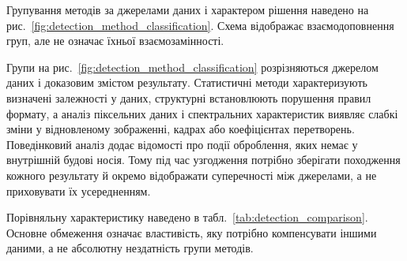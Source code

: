 Групування методів за джерелами даних і характером рішення наведено на рис.~\ref{fig:detection_method_classification}. Схема відображає взаємодоповнення груп, але не означає їхньої взаємозамінності.



Групи на рис.~\ref{fig:detection_method_classification} розрізняються джерелом даних і доказовим змістом результату. Статистичні методи характеризують визначені залежності у даних, структурні встановлюють порушення правил формату, а аналіз піксельних даних і спектральних характеристик виявляє слабкі зміни у відновленому зображенні, кадрах або коефіцієнтах перетворень. Поведінковий аналіз додає відомості про події оброблення, яких немає у внутрішній будові носія. Тому під час узгодження потрібно зберігати походження кожного результату й окремо відображати суперечності між джерелами, а не приховувати їх усередненням.

Порівняльну характеристику наведено в табл.~\ref{tab:detection_comparison}. Основне обмеження означає властивість, яку потрібно компенсувати іншими даними, а не абсолютну нездатність групи методів.

